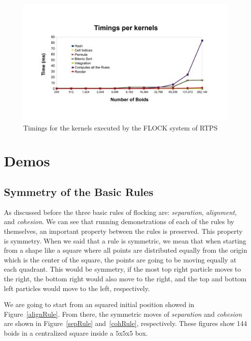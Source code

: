 \begin{figure}[htbp]
\begin{center}
\includegraphics[scale=0.55]{figures/kernelsPlot.pdf}
\caption{Timings for the kernels executed by the FLOCK system of RTPS}
\label{kernelBench}
\end{center}
\end{figure}


\section{Demos}

\subsection{Symmetry of the Basic Rules}
As discussed before the three basic rules of flocking are: \textit{separation}, \textit{alignment}, and \textit{cohesion}. We can see that running demonstrations of each of the rules by themselves, an important property between the rules is preserved. This property is symmetry. When we said that a rule is symmetric, we mean that when starting from a shape like a square where all points are distributed equally from the origin which is the center of the square, the points are going to be moving equally at each quadrant. This would be symmetry, if the most top right particle moves to the right, the bottom right would also move to the right, and the top and bottom left particles would move to the left, respectively.

We are going to start from an squared initial position showed in Figure~\ref{alignRule}. From there, the symmetric moves of \textit{separation} and \textit{cohesion} are shown in Figure~\ref{sepRule} and~\ref{cohRule}, respectively. These figures show 144 boids in a centralized square inside a $5$x$5$x$5$ box.

